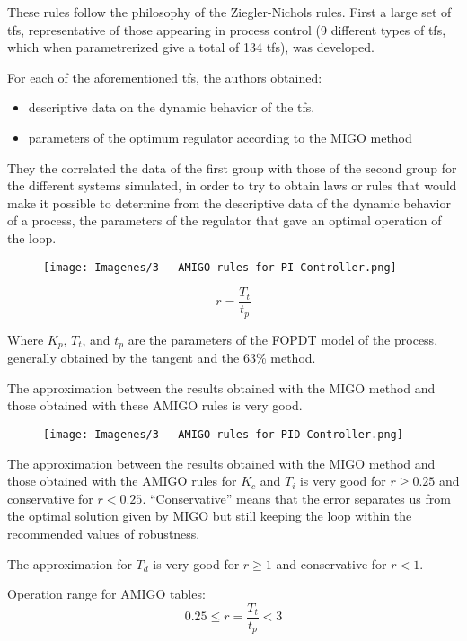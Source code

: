 These rules follow the philosophy of the Ziegler-Nichols rules. First a large set of tfs, representative of those appearing in process control (9 different types of tfs, which when parametrerized give a total of 134 tfs), was developed.

For each of the aforementioned tfs, the authors obtained:
\begin{itemize}
    \item descriptive data on the dynamic behavior of the tfs.
    \item parameters of the optimum regulator according to the MIGO method
\end{itemize}

They the correlated the data of the first group with those of the second group for the different systems simulated, in order to try to obtain laws or rules that would make it possible to determine from the descriptive data of the dynamic behavior of a process, the parameters of the regulator that gave an optimal operation of the loop.

\begin{figure}[H]
    \centering
    \texttt{[image: Imagenes/3 - AMIGO rules for PI Controller.png]}
\end{figure}

\[r = \frac{T_t}{t_p}\]

Where $K_p$, $T_t$, and $t_p$ are the parameters of the FOPDT model of the process, generally obtained by the tangent and the 63\% method.

The approximation between the results obtained with the MIGO method and those obtained with these AMIGO rules is very good.

\begin{figure}[H]
    \centering
    \texttt{[image: Imagenes/3 - AMIGO rules for PID Controller.png]}
\end{figure}

The approximation between the results obtained with the MIGO method and those obtained with the AMIGO rules for $K_c$ and $T_i$ is very good for $r \geq 0.25$ and conservative for $r < 0.25$. ``Conservative'' means that the error separates us from the optimal solution given by MIGO but still keeping the loop within the recommended values of robustness.

The approximation for $T_d$ is very good for $r \geq 1$ and conservative for $r < 1$.

Operation range for AMIGO tables: 
\[0.25 \leq r = \frac{T_t}{t_p} < 3\]


